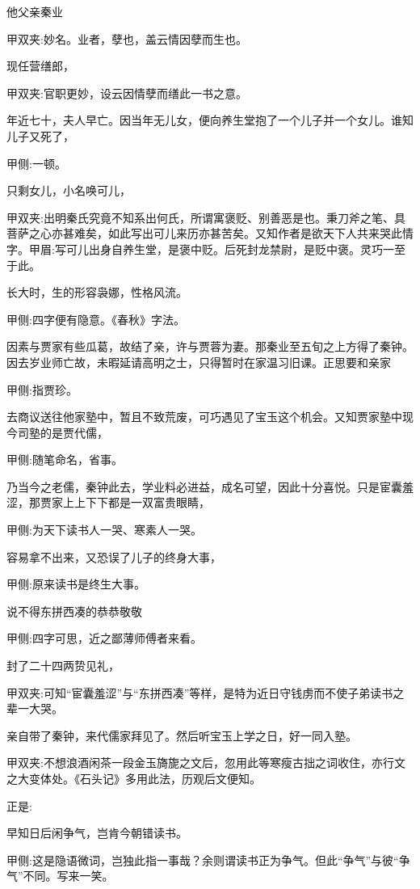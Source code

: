 \begin{parag}
    他父亲秦业\begin{note}甲双夹:妙名。业者，孽也，盖云情因孽而生也。\end{note}现任营缮郎，\begin{note}甲双夹:官职更妙，设云因情孽而缮此一书之意。\end{note}年近七十，夫人早亡。因当年无儿女，便向养生堂抱了一个儿子并一个女儿。谁知儿子又死了，\begin{note}甲侧:一顿。\end{note}只剩女儿，小名唤可儿，\begin{note}甲双夹:出明秦氏究竟不知系出何氏，所谓寓褒贬、别善恶是也。秉刀斧之笔、具菩萨之心亦甚难矣，如此写出可儿来历亦甚苦矣。又知作者是欲天下人共来哭此情字。甲眉:写可儿出身自养生堂，是褒中贬。后死封龙禁尉，是贬中褒。灵巧一至于此。\end{note}长大时，生的形容袅娜，性格风流。\begin{note}甲侧:四字便有隐意。《春秋》字法。\end{note}因素与贾家有些瓜葛，故结了亲，许与贾蓉为妻。那秦业至五旬之上方得了秦钟。因去岁业师亡故，未暇延请高明之士，只得暂时在家温习旧课。正思要和亲家\begin{note}甲侧:指贾珍。\end{note}去商议送往他家塾中，暂且不致荒废，可巧遇见了宝玉这个机会。又知贾家塾中现今司塾的是贾代儒，\begin{note}甲侧:随笔命名，省事。\end{note}乃当今之老儒，秦钟此去，学业料必进益，成名可望，因此十分喜悦。只是宦囊羞涩，那贾家上上下下都是一双富贵眼睛，\begin{note}甲侧:为天下读书人一哭、寒素人一哭。\end{note}容易拿不出来，又恐误了儿子的终身大事，\begin{note}甲侧:原来读书是终生大事。\end{note}说不得东拼西凑的恭恭敬敬\begin{note}甲侧:四字可思，近之鄙薄师傅者来看。\end{note}封了二十四两贽见礼，\begin{note}甲双夹:可知“宦囊羞涩”与“东拼西凑”等样，是特为近日守钱虏而不使子弟读书之辈一大哭。\end{note}亲自带了秦钟，来代儒家拜见了。然后听宝玉上学之日，好一同入塾。\begin{note}甲双夹:不想浪酒闲茶一段金玉旖旎之文后，忽用此等寒瘦古拙之词收住，亦行文之大变体处。《石头记》多用此法，历观后文便知。\end{note}正是:
\end{parag}


\begin{poem}
    \begin{pl}早知日后闲争气，岂肯今朝错读书。\end{pl}
    \begin{note}甲侧:这是隐语微词，岂独此指一事哉？余则谓读书正为争气。但此“争气”与彼“争气”不同。写来一笑。\end{note}
\end{poem}